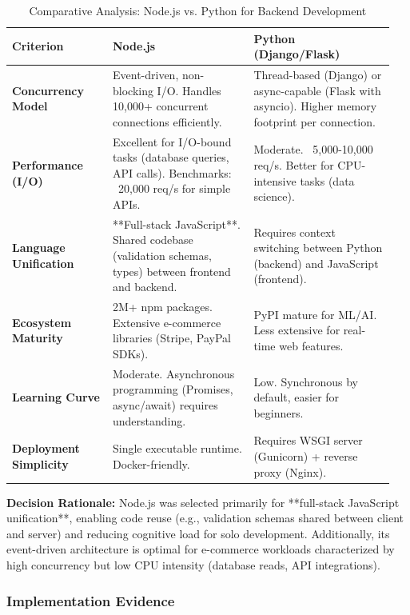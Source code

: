 \documentclass[12pt, a4paper]{report}
\begin{document}
\begin{table}[H]
\centering
\caption{Comparative Analysis: Node.js vs. Python for Backend Development}
\label{tab:nodejs_vs_python}
\begin{tabular}{@{}p{0.25\linewidth}p{0.35\linewidth}p{0.35\linewidth}@{}}
\toprule
\textbf{Criterion} & \textbf{Node.js} & \textbf{Python (Django/Flask)} \\
\midrule
\textbf{Concurrency Model} & Event-driven, non-blocking I/O. Handles 10,000+ concurrent connections efficiently. & Thread-based (Django) or async-capable (Flask with asyncio). Higher memory footprint per connection. \\
\textbf{Performance (I/O)} & Excellent for I/O-bound tasks (database queries, API calls). Benchmarks: ~20,000 req/s for simple APIs. & Moderate. ~5,000-10,000 req/s. Better for CPU-intensive tasks (data science). \\
\textbf{Language Unification} & **Full-stack JavaScript**. Shared codebase (validation schemas, types) between frontend and backend. & Requires context switching between Python (backend) and JavaScript (frontend). \\
\textbf{Ecosystem Maturity} & 2M+ npm packages. Extensive e-commerce libraries (Stripe, PayPal SDKs). & PyPI mature for ML/AI. Less extensive for real-time web features. \\
\textbf{Learning Curve} & Moderate. Asynchronous programming (Promises, async/await) requires understanding. & Low. Synchronous by default, easier for beginners. \\
\textbf{Deployment Simplicity} & Single executable runtime. Docker-friendly. & Requires WSGI server (Gunicorn) + reverse proxy (Nginx). \\
\bottomrule
\end{tabular}
\end{table}

\textbf{Decision Rationale:} Node.js was selected primarily for **full-stack JavaScript unification**, enabling code reuse (e.g., validation schemas shared between client and server) and reducing cognitive load for solo development. Additionally, its event-driven architecture is optimal for e-commerce workloads characterized by high concurrency but low CPU intensity (database reads, API integrations).

\subsubsection{Implementation Evidence}
\end{document}
